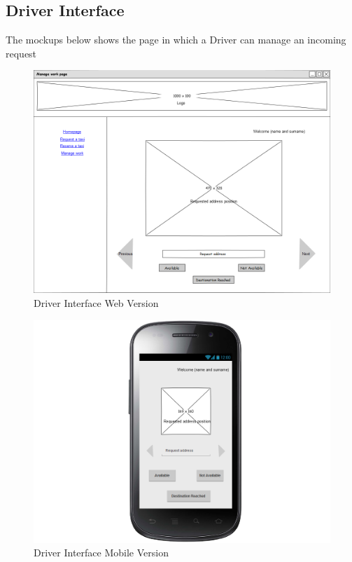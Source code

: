 \subsection{Driver Interface}
The mockups below shows the page in which a Driver can manage an incoming request
\begin{figure}[H]
\centering
\includegraphics[scale=0.35]{mockups/manage_work_web.png}
\caption{Driver Interface Web Version}
\end{figure}
\begin{figure}[H]
\centering
\includegraphics[scale=0.35]{mockups/manage_work_mobile.png}
\caption{Driver Interface Mobile Version}
\end{figure}
\break